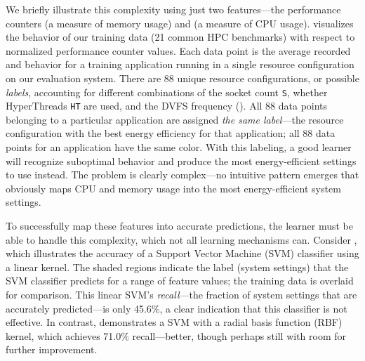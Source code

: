 We briefly illustrate this complexity using just two features---the performance counters  (a measure of memory usage) and  (a measure of CPU usage).
 visualizes the behavior of our training data (21 common HPC benchmarks) with respect to normalized performance counter values.
Each data point is the average recorded  and  behavior for a training application running in a single resource configuration on our evaluation system.
There are 88 unique resource configurations, or possible \emph{labels}, accounting for different combinations of the socket count \texttt{S}, whether HyperThreads \texttt{HT} are used, and the DVFS frequency (\GHz).
All 88 data points belonging to a particular application are assigned \emph{the same label}---the resource configuration with the best energy efficiency for that application; \ie all 88 data points for an application have the same color.
With this labeling, a good learner will recognize suboptimal behavior and produce the most energy-efficient settings to use instead.
The problem is clearly complex---no intuitive pattern emerges that obviously maps CPU and memory usage into the most energy-efficient system settings.

To successfully map these features into accurate predictions, the learner must be able to handle this complexity, which not all learning mechanisms can.
Consider , which illustrates the accuracy of a Support Vector Machine (SVM) classifier using a linear kernel.
The shaded regions indicate the label (system settings) that the SVM classifier predicts for a range of feature values; the training data is overlaid for comparison.
This linear SVM's \emph{recall}---the fraction of system settings that are accurately predicted---is only 45.6\%, a clear indication that this classifier is not effective.
In contrast,  demonstrates a SVM with a radial basis function (RBF) kernel, which achieves 71.0\% recall---better, though perhaps still with room for further improvement.
